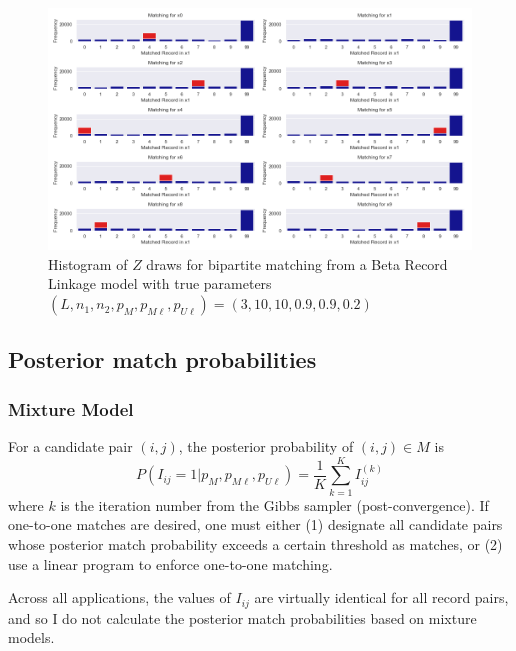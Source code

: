\documentclass[11pt,reqno]{amsart}
\begin{document}
\begin{figure}[h!]
\begin{center}
\includegraphics[width=\textwidth]{../Figures/bpm/nM9/ZmatchesnM9_L3.png}
\caption{Histogram of $Z$ draws for bipartite matching from a Beta Record Linkage model with true parameters $(L, n_1, n_2, p_M, p_{M\ell}, p_{U\ell}) = (3, 10, 10, 0.9, 0.9, 0.2)$ }
\label{Ztrace}
\end{center}
\end{figure}

\subsection{Posterior match probabilities}

\subsubsection{Mixture Model} For a candidate pair $(i,j)$, the posterior probability of $(i,j)\in M$ is \begin{equation}P(I_{ij}  = 1 | p_M, p_{M\ell}, p_{U\ell}) = \frac{1}{K}\sum_{k=1}^K I_{ij}^{(k)}\end{equation} where $k$ is the iteration number from the Gibbs sampler (post-convergence).  If one-to-one matches are desired, one must either (1) designate all candidate pairs whose posterior match probability exceeds a certain threshold as matches, or (2) use a linear program to enforce one-to-one matching.  

Across all applications, the values of $I_{ij}$ are virtually identical for all record pairs, and so I do not calculate the posterior match probabilities based on mixture models.
\end{document}
